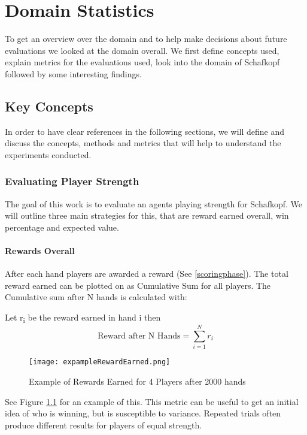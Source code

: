 \chapter{Domain Statistics}
To get an overview over the domain and to help make decisions about future evaluations we looked at the domain overall.
We first define concepts used, explain metrics for the evaluations used, look into the domain of Schafkopf followed by
some interesting findings.
\section{Key Concepts}
In order to have clear references in the following sections, we will define and discuss the concepts, methods and
metrics that will help to understand the experiments conducted.

\subsection{Evaluating Player Strength}
The goal of this work is to evaluate an agents playing strength for Schafkopf.
We will outline three main strategies for this, that are reward earned overall, win percentage and expected value.
\subsubsection{Rewards Overall}
After each hand players are awarded a reward (See \ref{scoringphase}).
The total reward earned can be plotted on as Cumulative Sum for all players.
The Cumulative sum after N hands is calculated with:
\newline
\begin{center}
    Let r\textsubscript{i} be the reward earned in hand i then
\begin{equation}
    \text{Reward after N Hands} = \sum_{i=1}^{N} r_{i}
\end{equation}
\newline
\begin{figure}[h]
    \centering
    \texttt{[image: expampleRewardEarned.png]}
    \caption{Example of Rewards Earned for 4 Players after 2000 hands}
    \label{fig:exampleCumSum}
\end{figure}
\end{center}
See Figure \ref{fig:exampleCumSum} for an example of this.\newline
This metric can be useful to get an initial idea of who is winning, but is susceptible to variance.\newline
Repeated trials often produce different results for players of equal strength.
